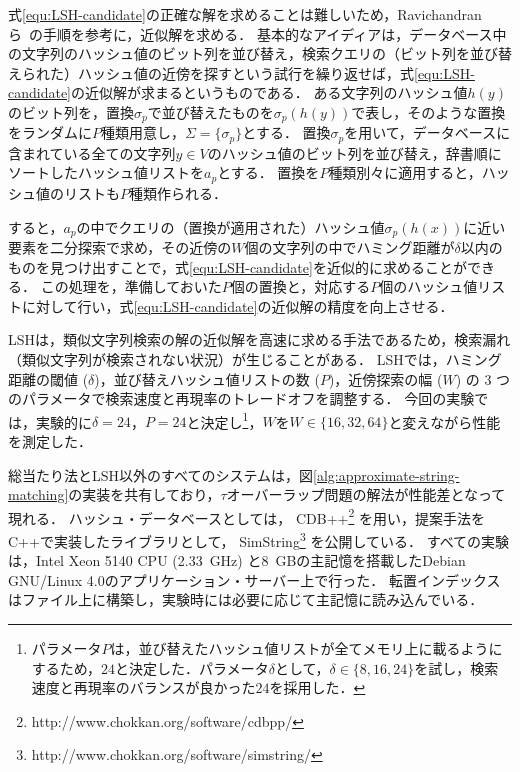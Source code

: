 \documentclass[japanese]{jnlp_JS2.0}
\begin{document}
\begin{itemize}
	式\ref{equ:LSH-candidate}の正確な解を求めることは難しいため，Ravichandranら~\cite{Ravichandran:06}の手順を参考に，近似解を求める．
	基本的なアイディアは，データベース中の文字列のハッシュ値のビット列を並び替え，検索クエリの（ビット列を並び替えられた）ハッシュ値の近傍を探すという試行を繰り返せば，式\ref{equ:LSH-candidate}の近似解が求まるというものである．
	ある文字列のハッシュ値$h(y)$のビット列を，置換$\sigma_p$で並び替えたものを$\sigma_p(h(y))$で表し，そのような置換をランダムに$P$種類用意し，$\Sigma = \{\sigma_p\}$とする．
	置換$\sigma_p$を用いて，データベースに含まれている全ての文字列$y \in V$のハッシュ値のビット列を並び替え，辞書順にソートしたハッシュ値リストを$a_p$とする．
	置換を$P$種類別々に適用すると，ハッシュ値のリストも$P$種類作られる．

	すると，$a_p$の中でクエリの（置換が適用された）ハッシュ値$\sigma_p(h(x))$に近い要素を二分探索で求め，その近傍の$W$個の文字列の中でハミング距離が$\delta$以内のものを見つけ出すことで，式\ref{equ:LSH-candidate}を近似的に求めることができる．
	この処理を，準備しておいた$P$個の置換と，対応する$P$個のハッシュ値リストに対して行い，式\ref{equ:LSH-candidate}の近似解の精度を向上させる．
	
	LSHは，類似文字列検索の解の近似解を高速に求める手法であるため，検索漏れ（類似文字列が検索されない状況）が生じることがある．
	LSHでは，ハミング距離の閾値 ($\delta$)，並び替えハッシュ値リストの数 ($P$)，近傍探索の幅 ($W$) の 3 つのパラメータで検索速度と再現率のトレードオフを調整する．
	今回の実験では，実験的に$\delta = 24$，$P = 24$と決定し\footnote{パラメータ$P$は，並び替えたハッシュ値リストが全てメモリ上に載るようにするため，$24$と決定した．パラメータ$\delta$として，$\delta \in \{8, 16, 24\}$を試し，検索速度と再現率のバランスが良かった$24$を採用した．}，$W$を$W \in \{16, 32, 64\}$と変えながら性能を測定した．
\end{itemize}

総当たり法とLSH以外のすべてのシステムは，図\ref{alg:approximate-string-matching}の実装を共有しており，$\tau$オーバーラップ問題の解法が性能差となって現れる．
ハッシュ・データベースとしては，
CDB++\footnote{http://www.chokkan.org/software/cdbpp/}
を用い，提案手法をC++で実装したライブラリとして，
SimString\footnote{http://www.chokkan.org/software/simstring/}
を公開している．
すべての実験は，Intel Xeon 5140 CPU (2.33~GHz) と8~GBの主記憶を搭載したDebian GNU/Linux 4.0のアプリケーション・サーバー上で行った．
転置インデックスはファイル上に構築し，実験時には必要に応じて主記憶に読み込んでいる．
\end{document}
